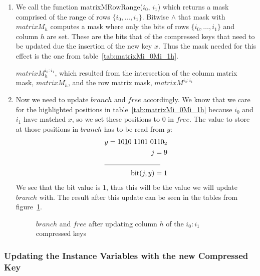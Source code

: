 \begin{enumerate}
    \item
    We call the function {\ttfamily matrixMRowRange($i_0$, $i_1$)} which returns a mask comprised of the range of rows $\{ i_0, \dots, i_1 \}$. Bitwise $\wedge$ that mask with $matrixM_h$ computes a mask where only the bits of rows $\{ i_0, \dots, i_1 \}$ and column $h$ are set. These are the bits that of the compressed keys that need to be updated due the insertion of the new key $x$. Thus the mask needed for this effect is the one from table~\ref{tab:matrixMi_0Mi_1h}.
    \begin{table}[H]
    \centering
    
    \caption[Example of the intersection of column matrix mask, $matrixM_1$, with the row matrix mask $matrixM^{2:3}$, resulting in the mask $matrixM^{2:3}_1$]{$matrixM^{i_0:i_1}_h$, which resulted from the intersection of the column matrix mask, $matrixM_h$, and the row matrix mask, $matrixM^{i_0:i_1}$}
    \label{tab:matrixMi_0Mi_1h}
    \end{table}
    
    \item
    Now we need to update $branch$ and $free$ accordingly. We know that we care for the highlighted positions in table~\ref{tab:matrixMi_0Mi_1h} because $i_0$ and $i_1$ have matched $x$, so we set these positions to $0$ in $free$. The value to store at those positions in $branch$ has to be read from $y$:
    \begin{align*}
        y = 10\underline{1}0\ 1101\ 0110_2 \\
        j = 9 \\
        \cline{1-2}
        \text{bit}(j, y) = 1
    \end{align*}
    We see that the bit value is $1$, thus this will be the value we will update $branch$ with. The result after this update can be seen in the tables from figure~\ref{fig:branchAndFreeAfterMatrixMi_0Mi_1h}.
    \begin{figure}[H]
    \centering
    
    \caption[Example of $branch$ and $free$ after updating column $1$ in rows $2$ and $3$]{$branch$ and $free$ after updating column $h$ of the $i_0:i_1$ compressed keys}
    \label{fig:branchAndFreeAfterMatrixMi_0Mi_1h}
    \end{figure}
\end{enumerate}

\subsubsection{Updating the Instance Variables with the new Compressed Key} \label{sec:updateRankRow}

